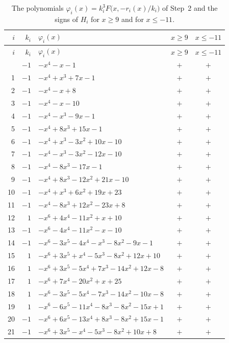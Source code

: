 \documentclass[11pt]{article}
\begin{document}
\begingroup\footnotesize
\setlength{\LTcapwidth}{\textwidth}
\begin{longtable}{@{}rrlcc@{}}
\caption{The polynomials $\varphi_i(x)=k_i^3F\bigl(x,-r_i(x)/k_i\bigr)$ of Step~2 and the signs of $H_i$ for $x\geq9$ and for $x\leq-11$.}\label{tab:phi}\\
\hline $i$ & $k_i$ & $\varphi_i(x)$ & $x\geq9$ & $x\leq-11$\\\hline\endfirsthead\hline $i$ & $k_i$ & $\varphi_i(x)$ & $x\geq9$ & $x\leq-11$\\\hline\endhead\hline\endfoot
0 & $-1$ & $-x^{4}-x-1$ & $+$ & $+$\\
1 & $-1$ & $-x^{4}+x^{3}+7x-1$ & $+$ & $+$\\
2 & $-1$ & $-x^{4}-x+8$ & $+$ & $+$\\
3 & $-1$ & $-x^{4}-x-10$ & $+$ & $+$\\
4 & $-1$ & $-x^{4}-x^{3}-9x-1$ & $+$ & $+$\\
5 & $-1$ & $-x^{4}+8x^{3}+15x-1$ & $+$ & $+$\\
6 & $-1$ & $-x^{4}+x^{3}-3x^{2}+10x-10$ & $+$ & $+$\\
7 & $-1$ & $-x^{4}-x^{3}-3x^{2}-12x-10$ & $+$ & $+$\\
8 & $-1$ & $-x^{4}-8x^{3}-17x-1$ & $+$ & $+$\\
9 & $-1$ & $-x^{4}+8x^{3}-12x^{2}+21x-10$ & $+$ & $+$\\
10 & $-1$ & $-x^{4}+x^{3}+6x^{2}+19x+23$ & $+$ & $+$\\
11 & $-1$ & $-x^{4}-8x^{3}+12x^{2}-23x+8$ & $+$ & $+$\\
12 & $1$ & $-x^{6}+4x^{4}-11x^{2}+x+10$ & $+$ & $+$\\
13 & $-1$ & $-x^{6}-4x^{4}-11x^{2}-x-10$ & $+$ & $+$\\
14 & $-1$ & $-x^{6}-3x^{5}-4x^{4}-x^{3}-8x^{2}-9x-1$ & $+$ & $+$\\
15 & $1$ & $-x^{6}+3x^{5}+x^{4}-5x^{3}-8x^{2}+12x+10$ & $+$ & $+$\\
16 & $1$ & $-x^{6}+3x^{5}-5x^{4}+7x^{3}-14x^{2}+12x-8$ & $+$ & $+$\\
17 & $1$ & $-x^{6}+7x^{4}-20x^{2}+x+25$ & $+$ & $+$\\
18 & $1$ & $-x^{6}-3x^{5}-5x^{4}-7x^{3}-14x^{2}-10x-8$ & $+$ & $+$\\
19 & $1$ & $-x^{6}-6x^{5}-11x^{4}-8x^{3}-8x^{2}-15x+1$ & $+$ & $+$\\
20 & $-1$ & $-x^{6}+6x^{5}-13x^{4}+8x^{3}-8x^{2}+15x-1$ & $+$ & $+$\\
21 & $-1$ & $-x^{6}+3x^{5}-x^{4}-5x^{3}-8x^{2}+10x+8$ & $+$ & $+$\\

\end{longtable}
\end{document}
